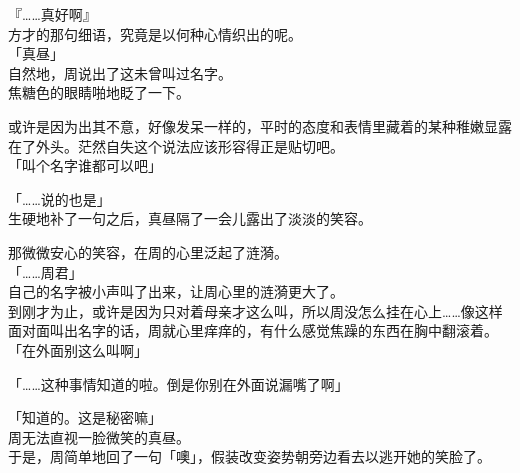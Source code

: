 『……真好啊』\\

方才的那句细语，究竟是以何种心情织出的呢。\\

「真昼」\\

自然地，周说出了这未曾叫过名字。\\

焦糖色的眼睛啪地眨了一下。

或许是因为出其不意，好像发呆一样的，平时的态度和表情里藏着的某种稚嫩显露在了外头。茫然自失这个说法应该形容得正是贴切吧。\\

「叫个名字谁都可以吧」

「……说的也是」\\

生硬地补了一句之后，真昼隔了一会儿露出了淡淡的笑容。

那微微安心的笑容，在周的心里泛起了涟漪。\\

「……周君」\\

自己的名字被小声叫了出来，让周心里的涟漪更大了。\\

到刚才为止，或许是因为只对着母亲才这么叫，所以周没怎么挂在心上……像这样面对面叫出名字的话，周就心里痒痒的，有什么感觉焦躁的东西在胸中翻滚着。\\

「在外面别这么叫啊」

「……这种事情知道的啦。倒是你别在外面说漏嘴了啊」

「知道的。这是秘密嘛」\\

周无法直视一脸微笑的真昼。\\

于是，周简单地回了一句「噢」，假装改变姿势朝旁边看去以逃开她的笑脸了。
